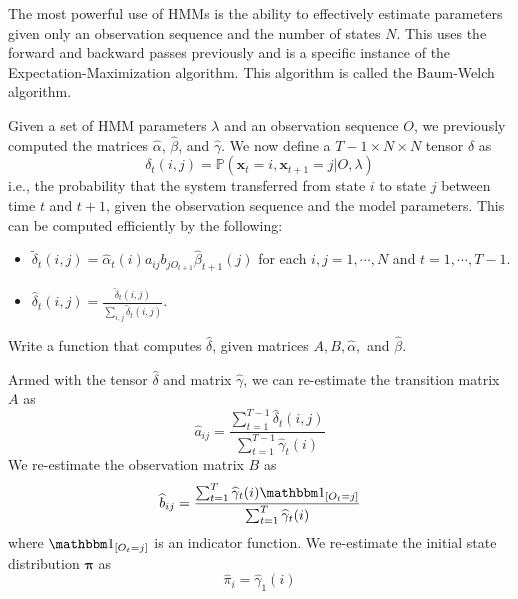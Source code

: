 

The most powerful use of HMMs is the ability to effectively estimate parameters given only an observation sequence and the number of states $N$. This uses the forward and backward passes previously and is a specific instance of the Expectation-Maximization algorithm. This algorithm is called the Baum-Welch algorithm.

Given a set of HMM parameters $\lambda$ and an observation sequence $O$, we previously computed the matrices $\widehat{\alpha}$, $\widehat{\beta}$, and $\widehat{\gamma}$. We now define a $T-1 \times N \times N$ tensor $\delta$ as 
\begin{equation*}
\delta_{t}(i,j) = \mathbb{P}(\mathbf{x}_{t} = i, \mathbf{x}_{t+1} = j | O, \lambda)
\end{equation*}
i.e., the probability that the system transferred from state $i$ to state $j$ between time $t$ and $t+1$, given the observation sequence and the model parameters. This can be computed efficiently by the following:
\begin{itemize}
 \item $\tilde{\delta}_{t}(i,j) = \widehat{\alpha}_{t}(i)a_{ij} b_{jO_{t+1}} \widehat{\beta}_{t+1}(j)$ for each $i,j = 1, \cdots, N$ and $t = 1, \cdots, T-1$.
 \item $\widehat{\delta}_{t}(i,j) = \frac{\tilde{\delta}_{t}(i,j)}{\sum_{i,j} \tilde{\delta}_{t}(i,j)}$.
\end{itemize}

\begin{problem}
Write a function that computes $\widehat{\delta}$, given matrices $A, B, \widehat{\alpha},$ and $\widehat{\beta}$.
\end{problem}

Armed with the tensor $\widehat{\delta}$ and matrix $\widehat{\gamma}$, we can re-estimate the transition matrix $A$ as
\begin{equation*}
\widehat{a}_{ij} = \frac{\sum_{t=1}^{T-1}\widehat{\delta}_{t}(i,j)}{\sum_{t=1}^{T-1}\widehat{\gamma}_{t}(i)}
\end{equation*}
We re-estimate the observation matrix $B$ as 
\begin{equation*}
\widehat{b}_{ij} = 
\frac{\sum_{t=1}^{T} \widehat{\gamma}_{t}(i) \indicator{O_{t} = j}} {\sum_{t=1}^{T} \widehat{\gamma}_{t}(i)}
\end{equation*}
where $\indicator{O_{t} = j}$ is an indicator function. We re-estimate the initial state distribution $\mathbf{\pi}$ as 
\begin{equation*}
\widehat{\pi}_{i} = \widehat{\gamma}_{1}(i)
\end{equation*}

